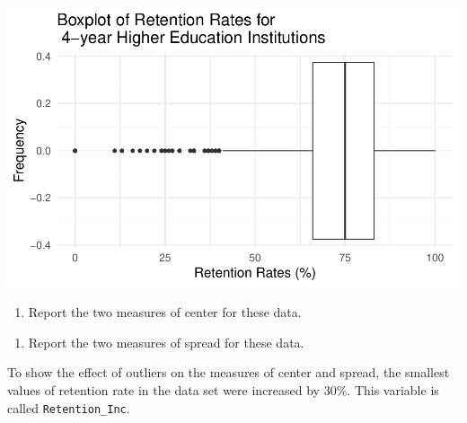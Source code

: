 \documentclass[
]{report}
\providecommand{\tightlist}{%
  \setlength{\itemsep}{0pt}\setlength{\parskip}{0pt}}
\begin{document}
\begin{center}\includegraphics[width=0.7\linewidth]{06-A11-EDA-quantitative_files/figure-latex/unnamed-chunk-4-1} \end{center}

\begin{enumerate}
\def\labelenumi{\arabic{enumi}.}
\setcounter{enumi}{10}
\tightlist
\item
  Report the two measures of center for these data.
\end{enumerate}

\vspace{0.5in}

\begin{enumerate}
\def\labelenumi{\arabic{enumi}.}
\setcounter{enumi}{11}
\tightlist
\item
  Report the two measures of spread for these data.
\end{enumerate}

\vspace{0.5in}

To show the effect of outliers on the measures of center and spread, the smallest values of retention rate in the
data set were increased by 30\%. This variable is called \texttt{Retention\_Inc}.
\end{document}
